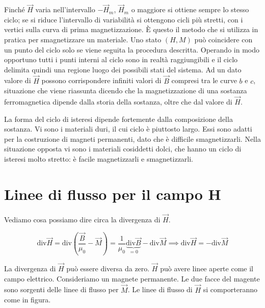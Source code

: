 Finché $\vec{H}$ varia nell'intervallo $-\vec{H}_m$, $\vec{H}_m$ o maggiore si ottiene sempre lo stesso ciclo; se si riduce l'intervallo di variabilità si ottengono cicli più stretti, con i vertici sulla curva di prima magnetizzazione. È questo il metodo che si utilizza in pratica per smagnetizzare un materiale. Uno stato $(H,M)$ può coincidere con un punto del ciclo solo se viene seguita la procedura descritta. Operando in modo opportuno tutti i punti interni al ciclo sono in realtà raggiungibili e il ciclo delimita quindi una regione luogo dei possibili stati del sistema. Ad un dato valore di $\vec{H}$ possono corrispondere infiniti valori di $\vec{B}$ compresi tra le curve $b$ e $c$, situazione che viene riassunta dicendo che la magnetizzazione di una sostanza ferromagnetica dipende dalla storia della sostanza, oltre che dal valore di $\vec{H}$.

La forma del ciclo di isteresi dipende fortemente dalla composizione della sostanza. Vi sono i materiali duri, il cui ciclo è piuttosto largo. Essi sono adatti per la costruzione di magneti permanenti, dato che è difficile smagnetizzarli. Nella situazione opposta vi sono i materiali cosiddetti dolci, che hanno un ciclo di isteresi molto stretto: è facile magnetizzarli e smagnetizzarli.

\section{Linee di flusso per il campo H}

Vediamo cosa possiamo dire circa la divergenza di $\vec{H}$.

\[
	\text{div}\vec{H} =\text{div}\left( \frac{\vec{B}}{\mu_0}-\vec{M}  \right) = \frac{1}{\mu_0} \underbrace{\text{div}\vec{B}}_{=0}-\text{div}\vec{M} \implies \text{div}\vec{H} = - \text{div}\vec{M}
\]

La divergenza di $\vec{H}$ può essere diversa da zero. $\vec{H}$ può avere linee aperte come il campo elettrico. Consideriamo un magnete permanente. Le due facce del magente sono sorgenti delle linee di flusso per $\vec{M}$. Le linee di flusso di $\vec{H}$ si comporteranno come in figura.

